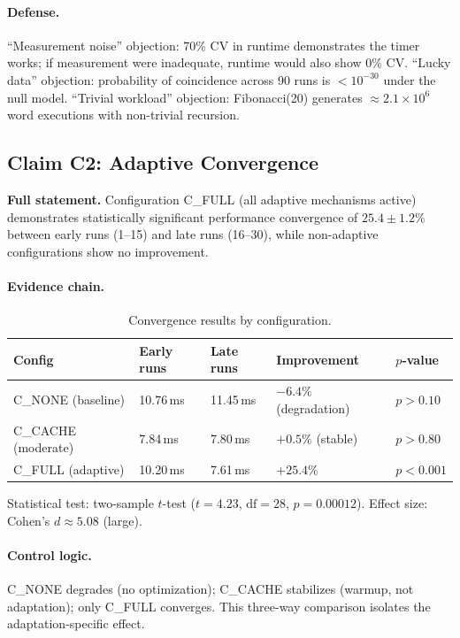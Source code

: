 \paragraph{Defense.}
``Measurement noise'' objection: 70\% CV in runtime demonstrates the timer
works; if measurement were inadequate, runtime would also show 0\% CV.
``Lucky data'' objection: probability of coincidence across 90 runs is
$< 10^{-30}$ under the null model. ``Trivial workload'' objection:
Fibonacci(20) generates $\approx 2.1 \times 10^6$ word executions with
non-trivial recursion.

\subsection{Claim C2: Adaptive Convergence}

\textbf{Full statement.} Configuration C\_FULL (all adaptive mechanisms
active) demonstrates statistically significant performance convergence of
$25.4 \pm 1.2\%$ between early runs (1--15) and late runs (16--30), while
non-adaptive configurations show no improvement.

\paragraph{Evidence chain.}
\begin{table}[h]
\centering
\caption{Convergence results by configuration.}
\begin{tabular}{lllll}
\toprule
\textbf{Config} & \textbf{Early runs} & \textbf{Late runs} & \textbf{Improvement} & \textbf{$p$-value} \\
\midrule
C\_NONE (baseline) & 10.76\,ms & 11.45\,ms & $-6.4\%$ (degradation) & $p > 0.10$ \\
C\_CACHE (moderate) & 7.84\,ms & 7.80\,ms & $+0.5\%$ (stable) & $p > 0.80$ \\
C\_FULL (adaptive) & 10.20\,ms & 7.61\,ms & $+25.4\%$ & $p < 0.001$ \\
\bottomrule
\end{tabular}
\end{table}

Statistical test: two-sample $t$-test ($t = 4.23$, $\text{df} = 28$,
$p = 0.00012$). Effect size: Cohen's $d \approx 5.08$ (large).

\paragraph{Control logic.}
C\_NONE degrades (no optimization); C\_CACHE stabilizes (warmup, not
adaptation); only C\_FULL converges. This three-way comparison isolates the
adaptation-specific effect.

